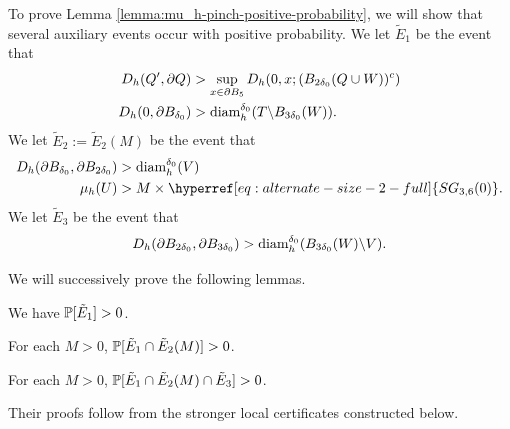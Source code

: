 \documentclass[12pt]{amsart}
\numberwithin{equation}{section}
\newcommand{\SGann}[2]{\hyperref[eq:alternate-size-2-full]{SG_{#1}(#2)}}
\begin{document}
	To prove Lemma \ref{lemma:mu_h-pinch-positive-probability}, we will show that several auxiliary events occur with positive probability. 
	We let $\tilde E_1$ be the event that
	\begin{equation} \label{eq:first-event}
	\begin{aligned}
	D_h(Q', \partial Q) &> \sup_{x \in \partial B_{5}} D_h(0, x; (B_{2 \delta_0}(Q \cup W))^c) \\
	D_h(0, \partial B_{\delta_0}) &> \diam^{\delta_0}_h(T \backslash B_{3 \delta_0}(W)) .
	\end{aligned}
	\end{equation}
	We let $\tilde E_2 := \tilde E_2(M)$ be the event that
	\begin{equation} \label{eq:second-event}
	\begin{aligned}
	D_h(\partial B_{\delta_0}, \partial B_{2 \delta_0}) &> \diam^{\delta_0}_h(V)  \\
	\mu_h(U) &> M \times \SGann{3,6}{0} .
	\end{aligned}
	\end{equation} 
	We let $\tilde E_3$ be the event that
	\begin{equation} \label{eq:third-event}
	D_h(\partial B_{2 \delta_0}, \partial B_{3 \delta_0}) > \diam_h^{\delta_0}(B_{3\delta_0}(W) \backslash V).
	\end{equation}
	
	We will successively prove the following lemmas. 
	
	\begin{lemma} \label{lemma:first-event-proof}
		We have $\P[\tilde E_1] > 0$. 
	\end{lemma}
	
	\begin{lemma} \label{lemma:second-event-proof}
		For each $M  > 0$, $\P[\tilde E_1 \cap \tilde E_2(M)] > 0$. 
	\end{lemma}
	
	\begin{lemma} \label{lemma:third-event-proof}
		For each $M  > 0$, $\P[\tilde E_1 \cap \tilde E_2(M) \cap \tilde E_3] > 0$. 
	\end{lemma}
	
Their proofs follow from the stronger local certificates constructed below.

\end{document}
